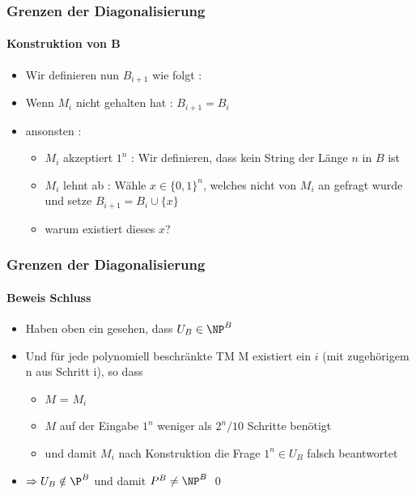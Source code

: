 \begin{frame}
	\frametitle{Grenzen der Diagonalisierung}
	\framesubtitle{Konstruktion von B}
	\begin{itemize}[<+->]
	  \item Wir definieren nun $B_{i+1}$ wie folgt :
	  \item Wenn $M_i$ nicht gehalten hat : $B_{i+1} = B_i$
	  \item ansonsten : \begin{itemize}
	    \item $M_i$ akzeptiert $1^n$ : Wir definieren, dass kein String der Länge $n$
	    in $B$ ist
	    \item $M_i$ lehnt ab : Wähle $x \in {\lbrace 0,1 \rbrace}^n$, welches nicht
	    von $M_i$ an gefragt wurde und setze $B_{i+1} = B_i \cup \lbrace x \rbrace$
	    \item warum existiert dieses $x$?
	    \end{itemize}
	\end{itemize}
\end{frame}

\begin{frame}
	\frametitle{Grenzen der Diagonalisierung}
	\framesubtitle{Beweis Schluss}
	
	\begin{itemize}[<+->]
	  \item Haben oben ein gesehen, dass $U_B \in {\NP}^B$
	  \item Und f\"ur jede polynomiell beschränkte TM M existiert ein $i$ (mit
	  zugeh\"origem n aus Schritt i), so dass
	  	\begin{itemize}
	  	  \item $M$ = $M_i$
	  	  \item $M$ auf der Eingabe $1^n$ weniger als $2^n / 10 $ Schritte benötigt
	  	  \item und damit $M_i$ nach Konstruktion die Frage $1^n \in U_B$ falsch beantwortet
	  	 \end{itemize}
	  	\item $\Rightarrow U_B \notin {\P}^B$ und damit ${P}^B \neq {\NP}^B$ \qed
	\end{itemize}
\end{frame}